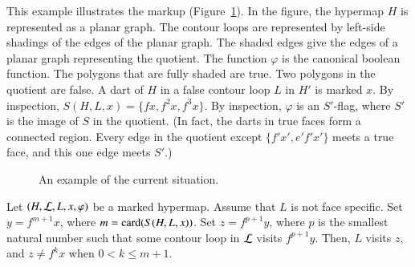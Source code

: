 \begin{example}[illustration]\label{ex:graph-gen}  
  This example illustrates the markup (Figure~\ref{fig:graph-gen}).  In
  the figure, the hypermap $H$ is represented as a planar graph.  The
  contour loops are represented by left-side shadings of the edges of
  the planar graph.  The shaded edges give the edges of a planar graph
  representing the quotient.  The function $\varphi$ is the canonical
  boolean function.  The polygons that are fully shaded are true.  Two
  polygons in the quotient are false.  A dart of $H$ in a false contour loop
   $L$ in $H'$ is marked $x$.  By inspection,  $S(H,L,x)=\{f
  x,f^2 x,f^3 x\}$.  By inspection, $\varphi$ is an $S'$-flag, where
  $S'$ is the image of $S$ in the quotient.  (In fact, the darts in true faces
  form a connected region.  Every edge in the quotient except  $\{f' x', e' f'
  x'\}$ meets a true face, and this one edge meets $S'$.)
\end{example}

\begin{figure}[htb]
\centering
{}
\caption{An example of the current situation.}
\label{fig:graph-gen}
\end{figure}


\begin{lemma} \label{lemma:yz}
Let $(H,{\cal L},L,x,\varphi)$ be a marked hypermap.
Assume that  $L$ is not face specific. %
Set  $y = f^{m+1} x$, where $m = {\operatorname{card}}(S(H,L,x))$.
  Set
$z=f^{p+1} y$, where $p$ is the smallest natural number 
such that some contour loop in ${\cal L}$ visits $f^{p+1} y$.
Then, $L$ visits $z$, and $z\ne f^k x$ when $0 < k \le {m+1}$.
\end{lemma}

